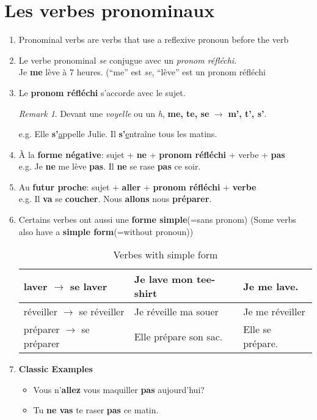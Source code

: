 \documentclass[math,code]{amznotes}
\theoremstyle{remark}
\newtheorem*{remark}{Remark}
\begin{document}
\section{Les verbes pronominaux}
\begin{enumerate}
    \item Pronominal verbs are verbs that use a reflexive pronoun before the verb
    \item Le verbe pronominal \textit{se} conjugue avec un \textit{pronom réfléchi}. \\
    Je \textbf{me} lève à 7 heures. (``me'' est \textit{se}, ``lève'' est un pronom réfléchi
    \item Le \textbf{pronom réfléchi} s'accorde avec le sujet.
    \begin{notebox}
        \begin{remark}
            Devant une \textit{voyelle} ou un \textit{h}, \textbf{me, te, se} $\rightarrow$ \textbf{m', t', s'}.
        \end{remark}
    \end{notebox}
    e.g. Elle \textbf{s'}\underline{a}ppelle Julie. Il \textbf{s'}\underline{e}ntraîne tous les matins.
    \item À la \textbf{forme négative}: sujet + \textbf{ne} + \textbf{pronom réfléchi} + verbe + \textbf{pas} \\
    e.g. Je \textbf{ne} me lève \textbf{pas}. Il \textbf{ne} se rase \textbf{pas} ce soir.
    \item Au \textbf{futur proche}: sujet + \textbf{aller} + \textbf{pronom réfléchi} + \textbf{verbe} \\
    e.g. Il \textbf{va} se \textbf{coucher}. Nous \textbf{allons} nous \textbf{préparer}.
    \item Certains verbes ont aussi une \textbf{forme simple}(=sans pronom) (Some verbs also have a \textbf{simple form}(=without pronoun)) \\
    \begin{table}[h]
    \centering
    \begin{tabular}{|l|l|l|}
    \hline
    laver $\rightarrow$ se laver         & Je lave mon tee-shirt & Je me lave.      \\ \hline
    réveiller $\rightarrow$ se réveiller & Je réveille ma souer  & Je me réveiller  \\ \hline
    préparer $\rightarrow$ se préparer   & Elle prépare son sac. & Elle se prépare. \\ \hline
    \end{tabular}
    \caption{ Verbes with simple form}
    \label{tab:verbes-with-simple-form}
    \end{table}
    \item \textbf{Classic Examples}
    \begin{itemize}
        \item Vous n'\textbf{allez} vous maquiller \textbf{pas} aujourd'hui?
        \item Tu \textbf{ne vas} te raser \textbf{pas} ce matin.
    \end{itemize}
\end{enumerate} 
\end{document}
